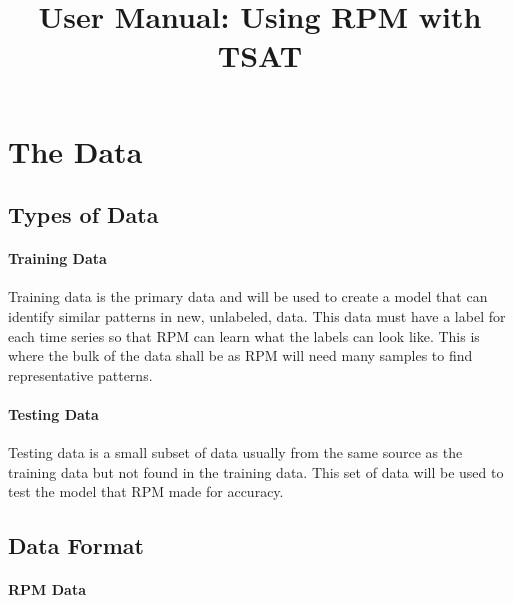 \documentclass[letterpaper, 12pt]{article}
\begin{document}
\title{User Manual: Using RPM with TSAT}
\maketitle
\tableofcontents
\newpage

\section{The Data}

\subsection{Types of Data}

\paragraph{Training Data}
Training data is the primary data and will be used to create a model that can identify similar patterns in new, unlabeled, data. This data must have a label for each time series so that RPM can learn what the labels can look like. This is where the bulk of the data shall be as RPM will need many samples to find representative patterns.

\paragraph{Testing Data}
Testing data is a small subset of data usually from the same source as the training data but not found in the training data. This set of data will be used to test the model that RPM made for accuracy.

\subsection{Data Format}

\paragraph{RPM Data}
\end{document}
